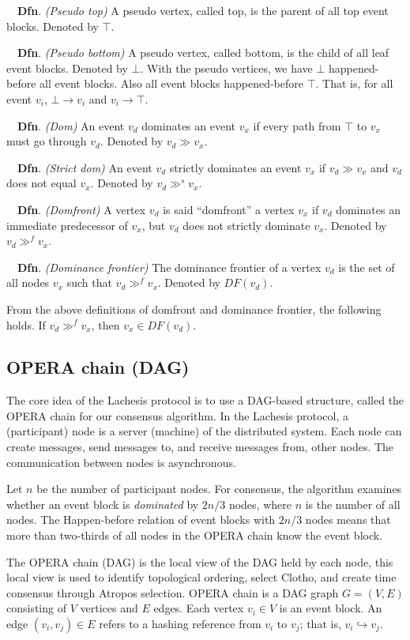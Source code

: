 \documentclass{article}
\newcommand{\dfnn}[2]{$\quad$\textbf{Dfn}. \emph{(#1)} {#2}}
\newcommand{\erefz}{\hookrightarrow}
\newcommand{\dom}{\gg}
\newcommand{\sdom}{\gg^{s}}
\newcommand{\domf}{\gg^{f}}
\newcommand{\hbefore}{\rightarrow}
\begin{document}
\dfnn{Pseudo top}{A pseudo vertex, called top, is the parent of all top event blocks. Denoted by $\top$.}

\dfnn{Pseudo bottom}{A pseudo vertex, called bottom, is the child of all leaf event blocks. Denoted by $\bot$.}
With the pseudo vertices, we have $\bot$ happened-before all event blocks. Also all event blocks happened-before $\top$. That is, for all event $v_i$, $\bot \hbefore v_i$ and $v_i \hbefore \top$.

\dfnn{Dom}{An event $v_d$ dominates an event $v_x$ if every path from $\top$ to $v_x$ must go through $v_d$. Denoted by $v_d \dom v_x$.}

\dfnn{Strict dom}{An event $v_d$ strictly dominates an event $v_x$ if $v_d \dom v_x$ and $v_d$ does not equal $v_x$. Denoted by $v_d \sdom v_x$.}

\dfnn{Domfront}{A vertex $v_d$ is said ``domfront'' a vertex $v_x$ if  $v_d$ dominates an immediate predecessor of $v_x$, but $v_d$ does not strictly dominate $v_x$. Denoted by $v_d \domf v_x$.}

\dfnn{Dominance frontier}{The dominance frontier of a vertex $v_d$ is the set of all nodes $v_x$ such that $v_d \domf v_x$. Denoted by $DF(v_d)$.}

 From the above definitions of domfront and dominance frontier, the following holds. If $v_d \domf v_x$, then $v_x \in DF(v_d)$.
	 
\subsection{OPERA chain (DAG)}

The core idea of the Lachesis protocol is to use a DAG-based structure, called the OPERA chain for our consensus algorithm. 
In the Lachesis protocol, a (participant) node is a server (machine) of the distributed system.
Each node can create messages, send messages to, and receive messages from, other nodes. The communication between nodes is asynchronous. 

Let $n$ be the number of participant nodes.
For consensus, the algorithm examines whether an event block is \emph{dominated} by $2n/3$ nodes, where $n$ is the number of all nodes. The Happen-before relation of event blocks with $2n/3$ nodes means that more than two-thirds of all nodes in the OPERA chain know the event block. 

The OPERA chain (DAG) is the local view of the DAG held by each node, this local view is used to identify topological ordering, select Clotho, and create time consensus through Atropos selection.
OPERA chain is a DAG graph $G = (V, E)$ consisting of $V$ vertices and $E$ edges. Each vertex $v_i \in V$ is an event block. An edge $(v_i,v_j) \in E$ refers to a hashing reference from $v_i$ to $v_j$; that is, $v_i \erefz v_j$.
\end{document}
